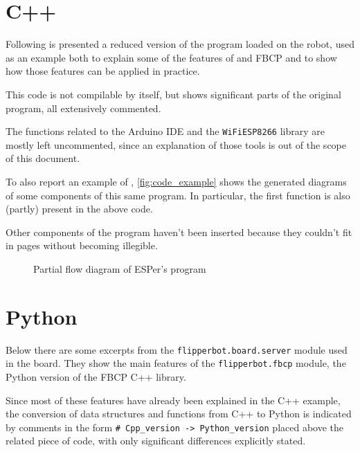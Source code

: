 \section{C++}
Following is presented a reduced version of the program loaded on the robot,
used as an example both to explain some of the features of \ScheMo and FBCP and
to show how those features can be applied in practice.

This code is not compilable by itself, but shows significant parts of the
original program, all extensively commented.

The functions related to the Arduino IDE and the \Verb|WiFiESP8266| library are
mostly left uncommented, since an explanation of those tools is out of the scope
of this document.



To also report an example of \ScheMoTeX, \autoref{fig:code_example} shows the
generated diagrams of some components of this same program. In particular,
the first function is also (partly) present in the above code.

Other components of the program haven't been inserted because they couldn't fit
in pages without becoming illegible.

\begin{figure}[hp]
  
  \caption{Partial flow diagram of ESPer's program}
  \label{fig:code_example}
\end{figure}

\section{Python}
Below there are some excerpts from the \Verb|flipperbot.board.server| module
used in the board. They show the main features of the \Verb|flipperbot.fbcp|
module, the Python version of the FBCP C++ library.

Since most of these features have already been explained in the C++ example,
the conversion of data structures and functions from C++ to Python is indicated
by comments in the form \Verb|# Cpp_version -> Python_version| placed above the
related piece of code, with only significant differences explicitly stated.


